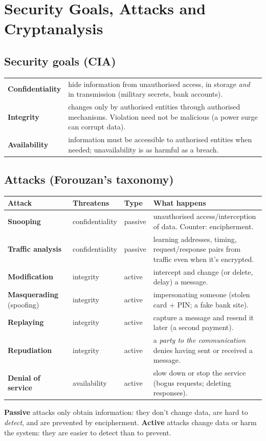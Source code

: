 \section{Security Goals, Attacks and Cryptanalysis}\label{sec:attacks}

\subsection{Security goals (CIA)}
\begin{center}\small
\begin{tabularx}{\textwidth}{@{}l X@{}}
\toprule
\textbf{Confidentiality} & hide information from unauthorised access, in storage \emph{and} in transmission (military secrets, bank accounts).\\
\textbf{Integrity} & changes only by authorised entities through authorised mechanisms. Violation need not be malicious (a power surge can corrupt data).\\
\textbf{Availability} & information must be accessible to authorised entities when needed; unavailability is as harmful as a breach.\\
\bottomrule
\end{tabularx}
\end{center}

\subsection{Attacks (Forouzan's taxonomy)}
\begin{center}\small
\begin{tabularx}{\textwidth}{@{}l l l X@{}}
\toprule
Attack & Threatens & Type & What happens\\
\midrule
\textbf{Snooping} & confidentiality & passive & unauthorised access/interception of data. Counter: encipherment.\\
\textbf{Traffic analysis} & confidentiality & passive & learning addresses, timing, request/response pairs from traffic even when it's encrypted.\\
\textbf{Modification} & integrity & active & intercept and change (or delete, delay) a message.\\
\textbf{Masquerading} (spoofing) & integrity & active & impersonating someone (stolen card + PIN; a fake bank site).\\
\textbf{Replaying} & integrity & active & capture a message and resend it later (a second payment).\\
\textbf{Repudiation} & integrity & active & a \emph{party to the communication} denies having sent or received a message.\\
\textbf{Denial of service} & availability & active & slow down or stop the service (bogus requests; deleting responses).\\
\bottomrule
\end{tabularx}
\end{center}
\textbf{Passive} attacks only obtain information: they don't change data, are hard to \emph{detect}, and are prevented by encipherment. \textbf{Active} attacks change data or harm the system: they are easier to detect than to prevent.

